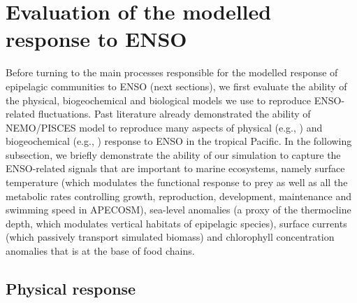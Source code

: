 \section{Evaluation of the modelled response to ENSO}
\label{sec:model-val}

Before turning to the main processes responsible for the modelled response of epipelagic communities to ENSO (next sections), we first evaluate the ability of the physical, biogeochemical and biological models we use to reproduce ENSO-related fluctuations. Past literature already demonstrated the ability of NEMO/PISCES model to reproduce many aspects of physical (e.g., \citealt{vialardModelStudyOceanic2001, lengaigneMechanismsControllingWarm2012, drushkaProcessesDrivingIntraseasonal2015, puyModulationEquatorialPacific2019}) and biogeochemical (e.g., \citealt{ masottiLargescaleShiftsPhytoplankton2011,gorguesRevisitingNina19982010, martinezReconstructingGlobalChlorophylla2020}) response to ENSO in the tropical Pacific. In the following subsection, we briefly demonstrate the ability of our simulation to capture the ENSO-related signals that are important to marine ecosystems, namely surface temperature (which modulates the functional response to prey as well as all the metabolic rates controlling growth, reproduction, development, maintenance and swimming speed in APECOSM), sea-level anomalies (a proxy of the thermocline depth, which modulates vertical habitats of epipelagic species), surface currents (which passively transport simulated biomass) and chlorophyll concentration anomalies that is at the base of food chains.

\subsection{Physical response}

